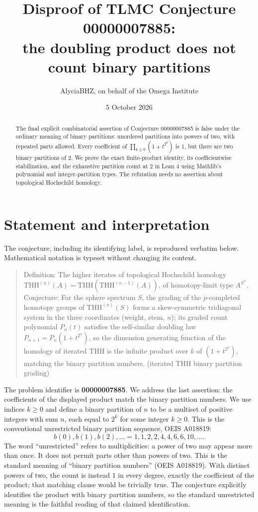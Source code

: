 \documentclass[11pt]{article}
\title{Disproof of TLMC Conjecture 00000007885:\\the doubling product does not count binary partitions}
\author{AlyciaBHZ, on behalf of the Omega Institute}
\date{5 October 2026}
\begin{document}
\sloppy
\setlength{\emergencystretch}{3em}
\maketitle

\begin{abstract}
The final explicit combinatorial assertion of Conjecture 00000007885 is false under the ordinary meaning of binary partitions: unordered partitions into powers of two, with repeated parts allowed. Every coefficient of $\prod_{k\geq0}(1+t^{2^k})$ is $1$, but there are two binary partitions of $2$. We prove the exact finite-product identity, its coefficientwise stabilization, and the exhaustive partition count at $2$ in Lean 4 using Mathlib's polynomial and integer-partition types. The refutation needs no assertion about topological Hochschild homology.
\end{abstract}

\section{Statement and interpretation}
The conjecture, including its identifying label, is reproduced verbatim below. Mathematical notation is typeset without changing its content.
\begin{quote}
Definition: The higher iterates of topological Hochschild homology
$\mathrm{THH}^{(n)}(A) = \mathrm{THH}(\mathrm{THH}^{(n-1)}(A))$,
of homotopy-limit type $A^{S^n}$. Conjecture: For the sphere spectrum $S$,
the grading of the $p$-completed homotopy groups of $\mathrm{THH}^{(n)}(S)$
forms a skew-symmetric tridiagonal system in the three coordinates
(weight, stem, $n$); its graded count polynomial $P_n(t)$ satisfies the
self-similar doubling law $P_{n+1} = P_n(1+t^{2^n})$, so the dimension
generating function of the homology of iterated THH is the infinite product
over $k$ of $(1+t^{2^k})$, matching the binary partition numbers.
(iterated THH binary partition grading)
\end{quote}

The problem identifier is \textbf{00000007885}. We address the last assertion: the coefficients of the displayed product match the binary partition numbers. We use indices $k\geq0$ and define a binary partition of $n$ to be a multiset of positive integers with sum $n$, each equal to $2^k$ for some integer $k\geq0$. This is the conventional unrestricted binary partition sequence, OEIS A018819:
\[
b(0),b(1),b(2),\ldots = 1,1,2,2,4,4,6,6,10,\ldots.
\]
The word ``unrestricted'' refers to multiplicities: a power of two may appear more than once. It does not permit parts other than powers of two. This is the standard meaning of ``binary partition numbers'' (OEIS A018819). With distinct powers of two, the count is instead $1$ in every degree, exactly the coefficient of the product; that matching clause would be trivially true. The conjecture explicitly identifies the product with binary partition numbers, so the standard unrestricted meaning is the faithful reading of that claimed identification.
\end{document}
